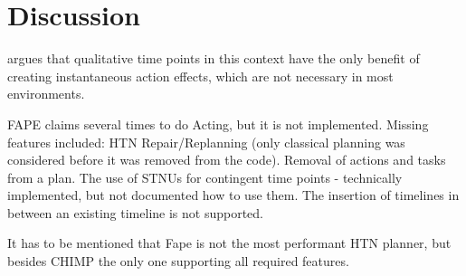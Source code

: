 \section{Discussion}\label{sec:discussion}


\cite{bit-monnotTemporalHierarchicalModels2017} argues that qualitative time points in this context have the only benefit of creating instantaneous action effects, which are not necessary in most environments.

FAPE claims several times to do Acting, but it is not implemented.
Missing features included: 
HTN Repair/Replanning (only classical planning was considered before it was removed from the code). 
Removal of actions and tasks from a plan.
The use of STNUs for contingent time points - technically implemented, but not documented how to use them.
The insertion of timelines in between an existing timeline is not supported.


It has to be mentioned that Fape is not the most performant HTN planner, but besides CHIMP the only one supporting all required features.
